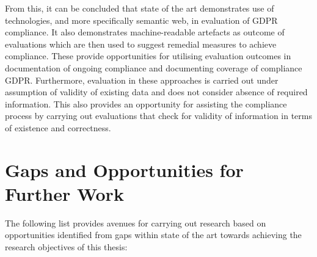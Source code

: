 From this, it can be concluded that state of the art demonstrates use of technologies, and more specifically semantic web, in evaluation of GDPR compliance. It also demonstrates machine-readable artefacts as outcome of evaluations which are then used to suggest remedial measures to achieve compliance. These provide opportunities for utilising evaluation outcomes in documentation of ongoing compliance and documenting coverage of compliance GDPR. Furthermore, evaluation in these approaches is carried out under assumption of validity of existing data and does not consider absence of required information. This also provides an opportunity for assisting the compliance process by carrying out evaluations that check for validity of information in terms of existence and correctness.

\section{Gaps and Opportunities for Further Work}
The following list provides avenues for carrying out research based on opportunities identified from gaps within state of the art towards achieving the research objectives of this thesis:
